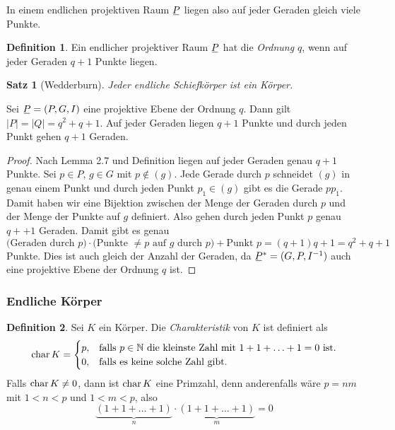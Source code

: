 \documentclass[
 a4paper,
 12pt,
 parskip=half
 ]{scrartcl}
\theoremstyle{plain}
\newtheorem*{thm*}{Satz}
\theoremstyle{definition}
\newtheorem*{defn*}{Definition}
\begin{document}
In einem endlichen projektiven Raum $\proj$ liegen also auf jeder Geraden gleich viele Punkte.

\begin{defn*}
 Ein endlicher projektiver Raum $\proj$ hat die \emph{Ordnung $q$}, wenn auf jeder Geraden $q+1$ Punkte liegen.
\end{defn*}

\begin{thm*}[Wedderburn]
 Jeder endliche Schiefkörper ist ein Körper.
\end{thm*}

\begin{thm}
 Sei $\proj = (P,G,I)$ eine projektive Ebene der Ordnung $q$. Dann gilt $|P| = |Q| = q^2 + q +1$. Auf jeder Geraden liegen $q+1$ Punkte und durch jeden Punkt gehen $q+1$ Geraden.
\end{thm}

\begin{proof}
 Nach Lemma 2.7 und Definition liegen auf jeder Geraden genau $q+1$ Punkte. Sei $p \in P$, $g \in G$ mit $p \notin (g)$. Jede Gerade durch $p$ schneidet $(g)$ in genau einem Punkt und durch jeden Punkt $p_1 \in (g)$ gibt es die Gerade $p p_1$. Damit haben wir eine Bijektion zwischen der Menge der Geraden durch $p$ und der Menge der Punkte auf $g$ definiert. Also gehen durch jeden Punkt $p$ genau $q++1$ Geraden. Damit gibt es genau 
 \[ \text{(Geraden durch $p$)} \cdot \text{(Punkte $\ne p$ auf $g$ durch $p$)} + \text{Punkt $p$} = (q+1)q + 1 = q^2 + q +1 \]
 Punkte. Dies ist auch gleich der Anzahl der Geraden, da $\proj^* = (G,P,I^{-1})$ auch eine projektive Ebene der Ordnung $q$ ist.
\end{proof}

\subsubsection*{Endliche Körper}
\begin{defn*}
 Sei $K$ ein Körper. Die \emph{Charakteristik} von $K$ ist definiert als
 \[ \mathrm{char}\, K = \begin{cases} 
    p, &\text{falls $p \in \mathbb{N}$ die kleinste Zahl mit $1 + 1 + \ldots + 1 = 0$ ist.} \\
    0, &\text{falls es keine solche Zahl gibt.}         
   \end{cases} \]
Falls $\mathrm{char}\, K \ne 0$, dann ist $\mathrm{char}\, K$ eine Primzahl, denn anderenfalls wäre $p = nm$ mit $1 < n < p$ und $1 < m < p$, also
\[ \underbrace{( 1 + 1 + \ldots + 1)}_n \cdot \underbrace{( 1 + 1 + \ldots + 1)}_m = 0 \]
\end{defn*}
\end{document}

